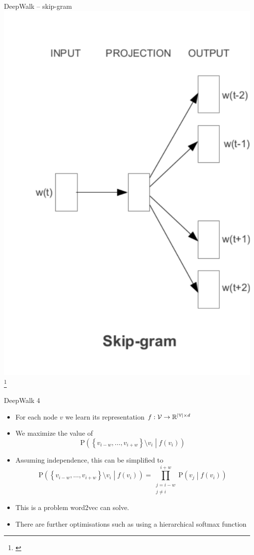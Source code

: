 \documentclass[10pt]{beamer}
\newcommand{\mathspace}{\ensuremath{\mathcal}}
\newcommand{\mathfield}{\ensuremath{\mathbb}}
\begin{document}
\begin{frame}{DeepWalk -- skip-gram}
	\centering
	\includegraphics[width=0.4\pagewidth]{images/SkipGram.pdf}\footnote{\cite{mikolov_efficient_2013}}
\end{frame}

\begin{frame}{DeepWalk 4}
	\begin{itemize}
		\item For each node \( v \) we learn its representation \( f : \mathspace{V} \to \mathfield{R}^{\left\lvert \mathfield{V} \right\rvert \times d} \)
		\item We maximize the value of
			\[ \mathrm{P} \left( \left\{ v_{i - w}, \dots, v_{i + w} \right\} \setminus v_i \middle| f \left( v_i \right) \right) \]
		\item Assuming independence, this can be simplified to
			\[ \mathrm{P} \left( \left\{ v_{i - w}, \dots, v_{i + w} \right\} \setminus v_i \middle| f \left( v_i \right) \right) = \prod_{\substack{j = i - w \\ j \neq i}}^{i + w} \mathrm{P} \left( v_j \middle| f \left( v_i \right) \right) \]
		\item This is a problem word2vec can solve.
		\item There are further optimisations such as using a hierarchical softmax function
	\end{itemize}
\end{frame}
\end{document}
